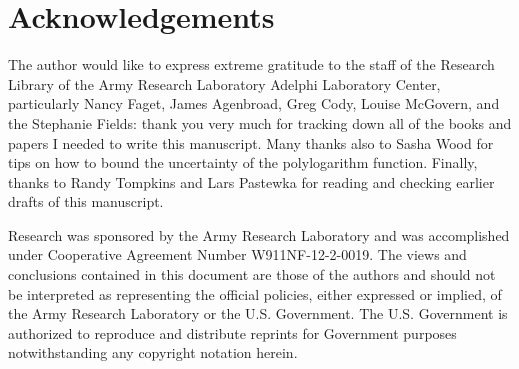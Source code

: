 \documentclass[letterpaper,12pt]{article}
\begin{document}
\section{Acknowledgements}
The author would like to express extreme gratitude to the staff of the Research Library of the Army Research Laboratory Adelphi Laboratory Center, particularly Nancy Faget, James Agenbroad, Greg Cody, Louise McGovern, and the Stephanie Fields: thank you very much for tracking down all of the books and papers I needed to write this manuscript. Many thanks also to Sasha Wood for tips on how to bound the uncertainty of the polylogarithm function. Finally, thanks to Randy Tompkins and Lars Pastewka for reading and checking earlier drafts of this manuscript.

Research was sponsored by the Army Research Laboratory and was accomplished under Cooperative Agreement Number W911NF-12-2-0019. The views and conclusions contained in this document are those of the authors and should not be interpreted as representing the official policies, either expressed or implied, of the Army Research Laboratory or the U.S. Government. The U.S. Government is authorized to reproduce and distribute reprints for Government purposes notwithstanding any copyright notation herein.




\end{document}
